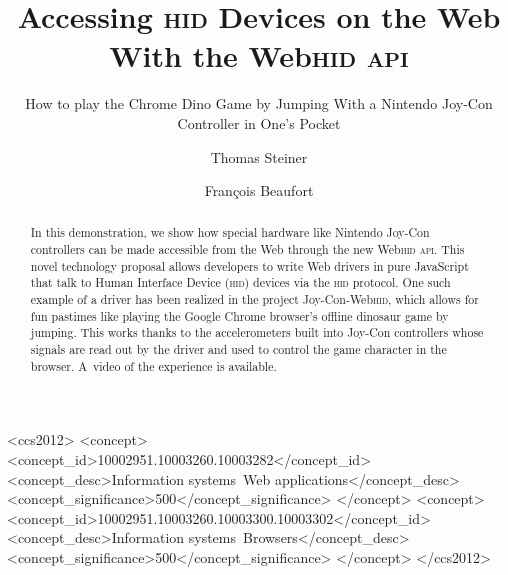 \documentclass[sigconf]{acmart}
\begin{document}
\title{Accessing \textsc{hid} Devices on the Web With the Web\textsc{hid} \textsc{api}}
\subtitle{How to play the Chrome Dino Game by Jumping With a Nintendo Joy-Con Controller in One's Pocket}

\author{Thomas Steiner}

\author{François Beaufort}

\renewcommand{\shortauthors}{}

\begin{abstract}
In this demonstration, we show how special hardware like Nintendo Joy-Con controllers
can be made accessible from the Web through the new Web\textsc{hid} \textsc{api}.
This novel technology proposal allows developers to write Web drivers in pure JavaScript
that talk to Human Interface Device (\textsc{hid}) devices via the \textsc{hid} protocol.
One such example of a driver has been realized in the project Joy-Con-Web\textsc{hid},
which allows for fun pastimes like playing the Google Chrome browser's
offline dinosaur game by jumping.
This works thanks to the accelerometers built into Joy-Con controllers
whose signals are read out by the driver and used to control the game
character in the browser. A~video of the experience is available.
\end{abstract}

\begin{CCSXML}
<ccs2012>
<concept>
<concept_id>10002951.10003260.10003282</concept_id>
<concept_desc>Information systems~Web applications</concept_desc>
<concept_significance>500</concept_significance>
</concept>
<concept>
<concept_id>10002951.10003260.10003300.10003302</concept_id>
<concept_desc>Information systems~Browsers</concept_desc>
<concept_significance>500</concept_significance>
</concept>
</ccs2012>
\end{CCSXML}



\maketitle
\end{document}
